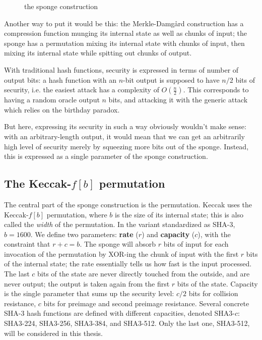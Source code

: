 \documentclass[times, utf8, diplomski]{fer}
\begin{document}

\begin{figure}[htb]\label{fig:sponge}
    \centering
    \caption{the sponge construction}
\end{figure}

Another way to put it would be this: the Merkle-Damgård construction has a
compression function munging its internal state as well as chunks of input;
the sponge has a permutation mixing its internal state with chunks of input,
then mixing its internal state while spitting out chunks of output.

With traditional hash functions, security is expressed in terms of number of
output bits: a hash function with an $n$-bit output is supposed to have $n/2$
bits of security, i.e. the easiest attack has a complexity of $O(\frac{n}{2})$.
This corresponds to having a random oracle output $n$ bits, and attacking it
with the generic attack which relies on the birthday paradox.

But here, expressing its security in such a way obviously wouldn't make sense:
with an arbitrary-length output, it would mean that we can get an arbitrarily
high level of security merely by squeezing more bits out of the sponge.
Instead, this is expressed as a single parameter of the sponge construction.


\subsection{The Keccak-$f[b]$ permutation}
The central part of the sponge construction is the permutation.
Keccak uses the Keccak-$f[b]$ permutation, where $b$ is the size of its internal
state; this is also called the \emph{width} of the permutation. In the variant
standardized as SHA-3, $b=1600$.
We define two parameters: \textbf{rate} ($r$) and \textbf{capacity} ($c$),
with the constraint that $r + c = b$. The sponge will absorb $r$ bits of input
for each invocation of the permutation by XOR-ing the chunk of input with the
first $r$ bits of the internal state; the rate essentially tells us how fast
is the input processed. The last $c$ bits of the state are never directly
touched from the outside, and are never output; the output is taken again from
the first $r$ bits of the state. Capacity is the single parameter that sums up
the security level: $c/2$ bits for collision resistance, $c$ bits for preimage
and second preimage resistance. Several concrete SHA-3 hash functions are
defined with different capacities, denoted SHA3-$c$: SHA3-224, SHA3-256,
SHA3-384, and SHA3-512. Only the last one, SHA3-512, will be considered in
this thesis.
\end{document}
